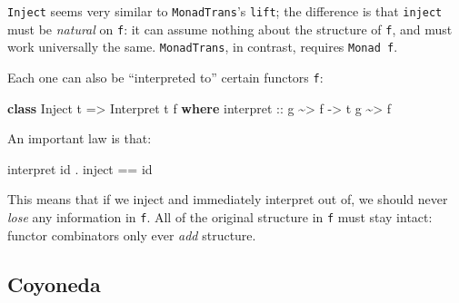 \documentclass[]{article}
\newenvironment{Shaded}{}{}
\newcommand{\DataTypeTok}[1]{\textcolor[rgb]{0.56,0.13,0.00}{#1}}
\newcommand{\FunctionTok}[1]{\textcolor[rgb]{0.02,0.16,0.49}{#1}}
\newcommand{\KeywordTok}[1]{\textcolor[rgb]{0.00,0.44,0.13}{\textbf{#1}}}
\newcommand{\NormalTok}[1]{#1}
\newcommand{\OperatorTok}[1]{\textcolor[rgb]{0.40,0.40,0.40}{#1}}
\newcommand{\OtherTok}[1]{\textcolor[rgb]{0.00,0.44,0.13}{#1}}
\begin{document}
\texttt{Inject} seems very similar to \texttt{MonadTrans}'s \texttt{lift}; the
difference is that \texttt{inject} must be \emph{natural} on \texttt{f}: it can
assume nothing about the structure of \texttt{f}, and must work universally the
same. \texttt{MonadTrans}, in contrast, requires \texttt{Monad\ f}.

Each one can also be ``interpreted to'' certain functors \texttt{f}:

\begin{Shaded}
\begin{Highlighting}[]
\KeywordTok{class} \DataTypeTok{Inject}\NormalTok{ t }\OtherTok{=\textgreater{}} \DataTypeTok{Interpret}\NormalTok{ t f }\KeywordTok{where}
\NormalTok{    interpret}
\OtherTok{        ::}\NormalTok{ g }\OperatorTok{\textasciitilde{}\textgreater{}}\NormalTok{ f}
        \OtherTok{{-}\textgreater{}}\NormalTok{ t g }\OperatorTok{\textasciitilde{}\textgreater{}}\NormalTok{ f}
\end{Highlighting}
\end{Shaded}

An important law is that:

\begin{Shaded}
\begin{Highlighting}[]
\NormalTok{interpret }\FunctionTok{id} \OperatorTok{.}\NormalTok{ inject }\OperatorTok{==} \FunctionTok{id}
\end{Highlighting}
\end{Shaded}

This means that if we inject and immediately interpret out of, we should never
\emph{lose} any information in \texttt{f}. All of the original structure in
\texttt{f} must stay intact: functor combinators only ever \emph{add} structure.

\subsection{Coyoneda}\label{coyoneda}
\end{document}
